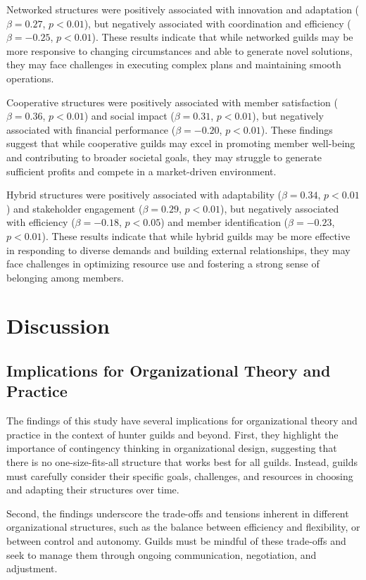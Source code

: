 \documentclass[12pt, a4paper]{article}
\begin{document}
Networked structures were positively associated with innovation and adaptation ($\beta = 0.27$, $p < 0.01$), but negatively associated with coordination and efficiency ($\beta = -0.25$, $p < 0.01$). These results indicate that while networked guilds may be more responsive to changing circumstances and able to generate novel solutions, they may face challenges in executing complex plans and maintaining smooth operations.

Cooperative structures were positively associated with member satisfaction ($\beta = 0.36$, $p < 0.01$) and social impact ($\beta = 0.31$, $p < 0.01$), but negatively associated with financial performance ($\beta = -0.20$, $p < 0.01$). These findings suggest that while cooperative guilds may excel in promoting member well-being and contributing to broader societal goals, they may struggle to generate sufficient profits and compete in a market-driven environment.

Hybrid structures were positively associated with adaptability ($\beta = 0.34$, $p < 0.01$) and stakeholder engagement ($\beta = 0.29$, $p < 0.01$), but negatively associated with efficiency ($\beta = -0.18$, $p < 0.05$) and member identification ($\beta = -0.23$, $p < 0.01$). These results indicate that while hybrid guilds may be more effective in responding to diverse demands and building external relationships, they may face challenges in optimizing resource use and fostering a strong sense of belonging among members.

\section{Discussion}
\subsection{Implications for Organizational Theory and Practice}
The findings of this study have several implications for organizational theory and practice in the context of hunter guilds and beyond. First, they highlight the importance of contingency thinking in organizational design, suggesting that there is no one-size-fits-all structure that works best for all guilds. Instead, guilds must carefully consider their specific goals, challenges, and resources in choosing and adapting their structures over time.

Second, the findings underscore the trade-offs and tensions inherent in different organizational structures, such as the balance between efficiency and flexibility, or between control and autonomy. Guilds must be mindful of these trade-offs and seek to manage them through ongoing communication, negotiation, and adjustment.
\end{document}
